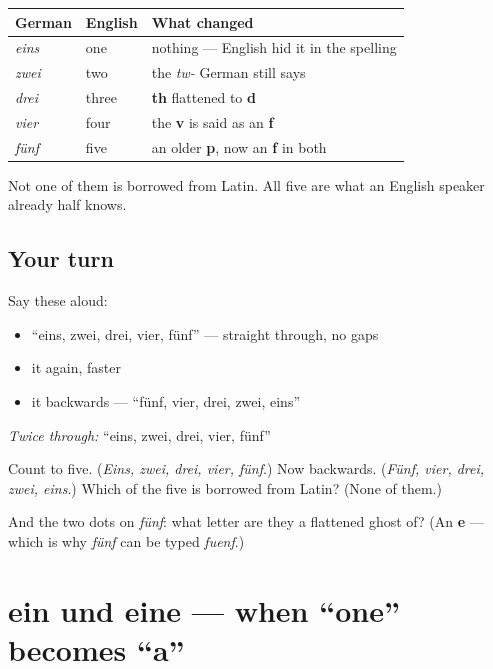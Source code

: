 \noindent
\begin{tabularx}{\linewidth}{@{}>{\raggedright\arraybackslash}X>{\raggedright\arraybackslash}X>{\raggedright\arraybackslash}X@{}}
\toprule
\textbf{German} & \textbf{English} & \textbf{What changed} \\
\midrule
\emph{eins} & one & nothing — English hid it in the spelling \\
\emph{zwei} & two & the \emph{tw-} German still says \\
\emph{drei} & three & \textbf{th} flattened to \textbf{d} \\
\emph{vier} & four & the \textbf{v} is said as an \textbf{f} \\
\emph{fünf} & five & an older \textbf{p}, now an \textbf{f} in both \\
\bottomrule
\end{tabularx}

Not one of them is borrowed from Latin. All five are what an English speaker already half knows.

\subsection*{Your turn}
Say these aloud:

\begin{itemize}
\raggedright
  \item \textquotedblleft{}eins, zwei, drei, vier, fünf\textquotedblright{} — straight through, no gaps
  \item it again, faster
  \item it backwards — \textquotedblleft{}fünf, vier, drei, zwei, eins\textquotedblright{}
\end{itemize}

\emph{Twice through:} \textquotedblleft{}eins, zwei, drei, vier, fünf\textquotedblright{}

\begin{tcolorbox}[breakable,colback=teal!4,colframe=teal!35!black,title={Before you move on}]
Count to five. (\emph{Eins, zwei, drei, vier, fünf}.) Now backwards. (\emph{Fünf, vier, drei, zwei, eins}.) Which of the five is borrowed from Latin? (None of them.)

And the two dots on \emph{fünf}: what letter are they a flattened ghost of? (An \textbf{e} — which is why \emph{fünf} can be typed \emph{fuenf}.)
\end{tcolorbox}
\section[ein / eine]{ein und eine — when \textquotedblleft{}one\textquotedblright{} becomes \textquotedblleft{}a\textquotedblright{}}

